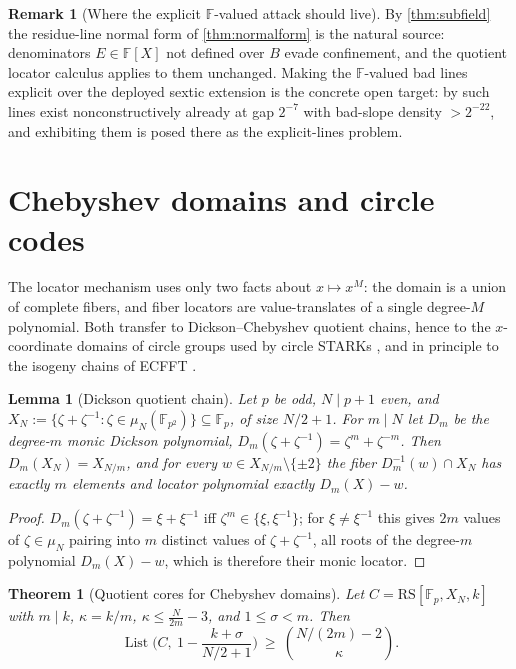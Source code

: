 \documentclass[11pt]{article}
\newtheorem{theorem}{Theorem}[section]
\newtheorem{lemma}[lemma]{Lemma}
\theoremstyle{definition}
\newtheorem{remark}[remark]{Remark}
\newcommand{\F}{\mathbb F}
\newcommand{\RS}{\mathrm{RS}}
\newcommand{\Lst}{\operatorname{List}}
\begin{document}
\begin{remark}[Where the explicit $\F$-valued attack should live]\label{rem:explicitattack}
By \cref{thm:subfield} the residue-line normal form of \cref{thm:normalform} is the natural source: denominators $E\in\F[X]$ not defined over $B$ evade confinement, and the quotient locator calculus applies to them unchanged.  Making the $\F$-valued bad lines explicit over the deployed sextic extension is the concrete open target: by \cite{UniversalCap} such lines exist nonconstructively already at gap $2^{-7}$ with bad-slope density $>2^{-22}$, and exhibiting them is posed there as the explicit-lines problem.
\end{remark}

\section{Chebyshev domains and circle codes}\label{sec:cheb}

The locator mechanism uses only two facts about $x\mapsto x^M$: the domain is a union of complete fibers, and fiber locators are value-translates of a single degree-$M$ polynomial.  Both transfer to Dickson--Chebyshev quotient chains, hence to the $x$-coordinate domains of circle groups used by circle STARKs \cite{HLP24}, and in principle to the isogeny chains of ECFFT \cite{ECFFT}.

\begin{lemma}[Dickson quotient chain]\label{lem:chebchain}
Let $p$ be odd, $N\mid p+1$ even, and $X_N:=\{\zeta+\zeta^{-1}:\zeta\in\mu_N(\F_{p^2})\}\subseteq\F_p$, of size $N/2+1$.  For $m\mid N$ let $D_m$ be the degree-$m$ monic Dickson polynomial, $D_m(\zeta+\zeta^{-1})=\zeta^m+\zeta^{-m}$.  Then $D_m(X_N)=X_{N/m}$, and for every $w\in X_{N/m}\setminus\{\pm2\}$ the fiber $D_m^{-1}(w)\cap X_N$ has exactly $m$ elements and locator polynomial exactly $D_m(X)-w$.
\end{lemma}

\begin{proof}
$D_m(\zeta+\zeta^{-1})=\xi+\xi^{-1}$ iff $\zeta^m\in\{\xi,\xi^{-1}\}$; for $\xi\ne\xi^{-1}$ this gives $2m$ values of $\zeta\in\mu_N$ pairing into $m$ distinct values of $\zeta+\zeta^{-1}$, all roots of the degree-$m$ polynomial $D_m(X)-w$, which is therefore their monic locator.
\end{proof}

\begin{theorem}[Quotient cores for Chebyshev domains]\label{thm:chebqcore}
Let $C=\RS[\F_p,X_N,k]$ with $m\mid k$, $\kappa=k/m$, $\kappa\le\frac N{2m}-3$, and $1\le\sigma<m$.  Then
\[
        \Lst\Big(C,\ 1-\frac{k+\sigma}{N/2+1}\Big)\ \ge\ \binom{N/(2m)-2}{\kappa}.
\]
\end{theorem}
\end{document}
